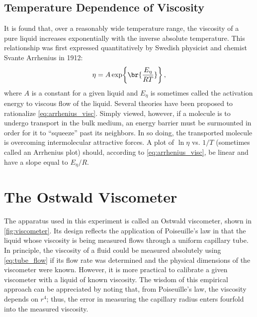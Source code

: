 \documentclass[nobib,nofonts,nols,nohyper]{tufte-handout}
\begin{document}
\subsection{Temperature Dependence of Viscosity} %
\label{sub:temperature_dependence_of_viscosity}

It is found that, over a reasonably wide temperature range, the viscosity of a pure liquid increases exponentially with the inverse absolute temperature.
This relationship was first expressed quantitatively by Swedish physicist and chemist Svante Arrhenius in 1912:
\begin{equation}
	\eta = A \exp\br{\frac{E_\eta}{R T}} \, ,
	\label{eq:arrhenius_visc}
\end{equation}
where \( A \) is a constant for a given liquid and \( E_\eta \) is sometimes called the activation energy to viscous flow of the liquid.
Several theories have been proposed to rationalize \cref{eq:arrhenius_visc}.
Simply viewed, however, if a molecule is to undergo transport in the bulk medium, an energy barrier must be surmounted in order for it to ``squeeze'' past its neighbors.
In so doing, the transported molecule is overcoming intermolecular attractive forces.
A plot of \( \ln{\eta} \) vs. \( 1/T \) (sometimes called an Arrhenius plot) should, according to \cref{eq:arrhenius_visc}, be linear and have a slope equal to \( E_\eta / R \).



\section{The Ostwald Viscometer} %
\label{sec:the_ostwald_viscometer}

The apparatus used in this experiment is called an Ostwald viscometer, shown in \cref{fig:viscometer}. 
Its design reflects the application of Poiseuille's law in that the liquid whose viscosity is being measured flows through a uniform capillary tube. 
In principle, the viscosity of a fluid could be measured absolutely using \cref{eq:tube_flow} if its flow rate was determined and the physical dimensions of the viscometer were known. 
However, it is more practical to calibrate a given viscometer with a liquid of known viscosity. 
The wisdom of this empirical approach can be appreciated by noting that, from Poiseuille's law, the viscosity depends on \( r^4 \); thus, the error in measuring the capillary radius enters fourfold into the measured viscosity.
\end{document}
